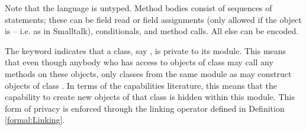 Note that the language is untyped. Method bodies consist of sequences of statements; these can be field read or field assignments (only allowed if the object is  -- i.e. as in Smalltalk), conditionals, and method calls. All else can be encoded.

 {The keyword  indicates that a class, say ,  is  private to its module. This means that even though anybody who has access to  objects of class  may  call any methods on these objects, only classes from the same module as  may construct objects of class .
   In terms of the capabilities literature, this means that the capability to create new objects of that class is hidden within this module.
   This form of privacy is enforced through the linking operator defined in Definition \ref{formal:Linking}.}


